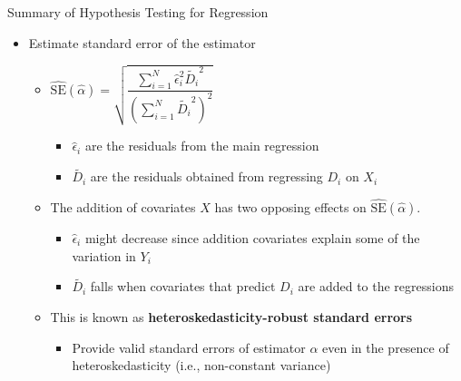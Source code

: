 \documentclass[dvipsnames,hyperref={pdfpagelabels=false}]{beamer}
\begin{document}
\begin{frame}{Summary of Hypothesis Testing for Regression}
\begin{itemize} 
	
\item[3.] Estimate standard error of the estimator 
	\begin{itemize} 
	\vspace{0.2cm}
	\item $\hat{\mathrm{SE}}(\hat{\alpha})= \sqrt{\dfrac{\sum_{i=1}^{N} \hat{\epsilon}_i^2 \widetilde{D_i}^2}{\left(\sum_{i=1}^{N} \widetilde{D_i}^2\right)^2}}$
	\vspace{0.2cm}
		\begin{itemize} 
   \item \(\hat{\epsilon}_i\) are the residuals from the main regression
   \vspace{0.2cm}
   \item \(\widetilde{D_i}\) are the residuals obtained from regressing \( D_i \) on \( X_i \)
   

\end{itemize}
\vspace{0.2cm}
\item The addition of covariates $X$ has two opposing effects on $\hat{\mathrm{SE}}(\hat{\alpha})$.
	\vspace{0.2cm}
	\begin{itemize} 
\item[1] \(\hat{\epsilon}_i\) might decrease since addition covariates explain some of the variation in $Y_{i}$
	\vspace{0.2cm}
\item[2] \(\widetilde{D_i}\) falls when covariates that predict $D_{i}$ are added to the regressions
	\end{itemize}
\vspace{0.2cm}
\item This is known as \textbf{heteroskedasticity-robust standard errors}
\vspace{0.2cm}
	\begin{itemize} 
\item Provide valid standard errors of estimator $\alpha$ even in the presence of heteroskedasticity (i.e., non-constant variance)
\end{itemize}
\end{itemize}
\end{itemize}
\end{frame}
\end{document}

